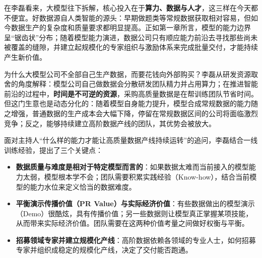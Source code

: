 \documentclass[UTF8,a4paper,11pt,fontset=fandol]{ctexart}
\begin{document}
在李磊看来，大模型往下拆解，核心投入在于\textbf{算力、数据与人才}，这三样在今天都不便宜。好数据源自人类智能的源头：早期做题类等常规数据获取相对容易，但如今数据生产的复杂度和质量要求都明显提高。正如第一章所言，模型的能力边界呈“锯齿状”分布；随着模型能力演进，数据公司只有顺应能力前沿去寻找那些尚未被覆盖的缝隙，并建立起规模化的专家组织与激励体系来完成批量交付，才能持续产生新价值。

为什么大模型公司不全部自己生产数据，而要花钱向外部购买？李磊从研发资源取舍的角度解释：模型公司自己做数据会分散研发团队精力并占用算力；在推进智能前沿的过程中，\textbf{时间是不可逆的资源}，采购高质量数据是在帮训练团队节省时间。但这门生意也是动态分化的：随着模型自身能力提升，模型合成常规数据的能力随之增强，普通数据的生产成本会大幅下降，停留在常规数据区间的公司将面临激烈竞争；反之，能够持续建立高阶数据产线的团队，其优势会被放大。

面对主持人“什么样的能力才能让高质量数据产线持续运转”的追问，李磊结合一线训练经验，提出了三个关键点：
\begin{itemize}
\item \textbf{数据质量与难度是相对于特定模型而言的}：如果数据太难而当前接入的模型能力太弱，模型根本学不会；团队需要积累实践经验（Know-how），结合当前模型的能力水位来定义恰当的数据难度。
\item \textbf{平衡演示传播价值（PR Value）与实际经济价值}：有些数据做出的模型演示（Demo）很酷炫，具有传播价值；另一些数据则让模型真正掌握某项技能，从而带来实际经济价值。团队需要在这两种价值考量之间做好权衡与平衡。
\item \textbf{招募领域专家并建立规模化产线}：高阶数据依赖各领域的专业人士，如何招募专家并组织成稳定的规模化产线，决定了交付能否跑通。
\end{itemize}
\end{document}

